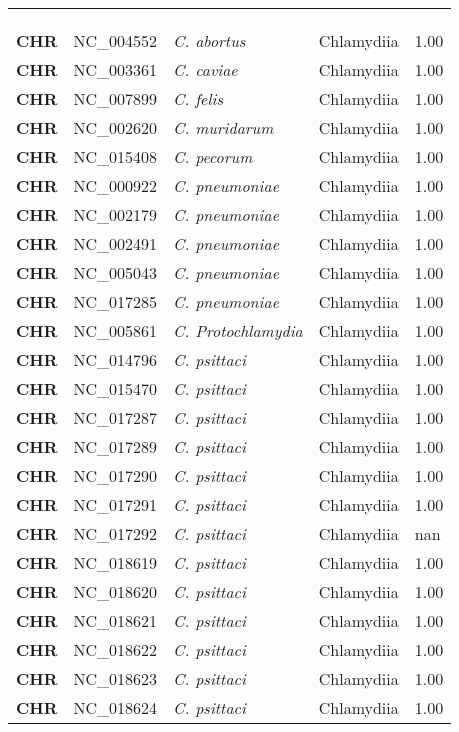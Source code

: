 \begin{adjustwidth}{-3cm}{2cm}
{\begin{supertabular}{>{\bfseries}l|p{0.1\textwidth}p{0.14\textwidth}l|l}
\\
\\
\hline\\
CHR & NC\_004552 & \textit{C. abortus} & Chlamydiia & 1.00\\
CHR & NC\_003361 & \textit{C. caviae} & Chlamydiia & 1.00\\
CHR & NC\_007899 & \textit{C. felis} & Chlamydiia & 1.00\\
CHR & NC\_002620 & \textit{C. muridarum} & Chlamydiia & 1.00\\
CHR & NC\_015408 & \textit{C. pecorum} & Chlamydiia & 1.00\\
CHR & NC\_000922 & \textit{C. pneumoniae} & Chlamydiia & 1.00\\
CHR & NC\_002179 & \textit{C. pneumoniae} & Chlamydiia & 1.00\\
CHR & NC\_002491 & \textit{C. pneumoniae} & Chlamydiia & 1.00\\
CHR & NC\_005043 & \textit{C. pneumoniae} & Chlamydiia & 1.00\\
CHR & NC\_017285 & \textit{C. pneumoniae} & Chlamydiia & 1.00\\
CHR & NC\_005861 & \textit{C. Protochlamydia} & Chlamydiia & 1.00\\
CHR & NC\_014796 & \textit{C. psittaci} & Chlamydiia & 1.00\\
CHR & NC\_015470 & \textit{C. psittaci} & Chlamydiia & 1.00\\
CHR & NC\_017287 & \textit{C. psittaci} & Chlamydiia & 1.00\\
CHR & NC\_017289 & \textit{C. psittaci} & Chlamydiia & 1.00\\
CHR & NC\_017290 & \textit{C. psittaci} & Chlamydiia & 1.00\\
CHR & NC\_017291 & \textit{C. psittaci} & Chlamydiia & 1.00\\
CHR & NC\_017292 & \textit{C. psittaci} & Chlamydiia & nan\\
CHR & NC\_018619 & \textit{C. psittaci} & Chlamydiia & 1.00\\
CHR & NC\_018620 & \textit{C. psittaci} & Chlamydiia & 1.00\\
CHR & NC\_018621 & \textit{C. psittaci} & Chlamydiia & 1.00\\
CHR & NC\_018622 & \textit{C. psittaci} & Chlamydiia & 1.00\\
CHR & NC\_018623 & \textit{C. psittaci} & Chlamydiia & 1.00\\
CHR & NC\_018624 & \textit{C. psittaci} & Chlamydiia & 1.00\\

\end{supertabular}}
\end{adjustwidth}
